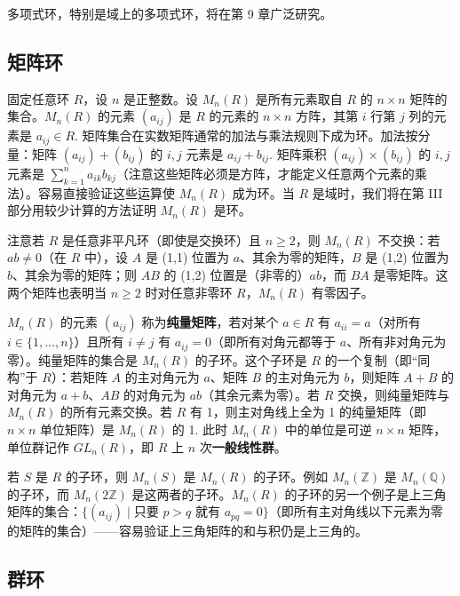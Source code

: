 多项式环，特别是域上的多项式环，将在第 9 章广泛研究。

\subsection*{矩阵环}

固定任意环 \(R\)，设 \(n\) 是正整数。设 \(M_n(R)\) 是所有元素取自 \(R\) 的 \(n \times n\) 矩阵的集合。\(M_n(R)\) 的元素 \((a_{ij})\) 是 \(R\) 的元素的 \(n \times n\) 方阵，其第 \(i\) 行第 \(j\) 列的元素是 \(a_{ij} \in R\). 矩阵集合在实数矩阵通常的加法与乘法规则下成为环。加法按分量：矩阵 \((a_{ij}) + (b_{ij})\) 的 \(i, j\) 元素是 \(a_{ij} + b_{ij}\). 矩阵乘积 \((a_{ij}) \times (b_{ij})\) 的 \(i, j\) 元素是 \(\sum_{k=1}^{n} a_{ik}b_{kj}\)（注意这些矩阵必须是方阵，才能定义任意两个元素的乘法）。容易直接验证这些运算使 \(M_n(R)\) 成为环。当 \(R\) 是域时，我们将在第 III 部分用较少计算的方法证明 \(M_n(R)\) 是环。

注意若 \(R\) 是任意非平凡环（即使是交换环）且 \(n \geq 2\)，则 \(M_n(R)\) 不交换：若 \(ab \neq 0\)（在 \(R\) 中），设 \(A\) 是 (1,1) 位置为 \(a\)、其余为零的矩阵，\(B\) 是 (1,2) 位置为 \(b\)、其余为零的矩阵；则 \(AB\) 的 (1,2) 位置是（非零的）\(ab\)，而 \(BA\) 是零矩阵。这两个矩阵也表明当 \(n \geq 2\) 时对任意非零环 \(R\)，\(M_n(R)\) 有零因子。

\(M_n(R)\) 的元素 \((a_{ij})\) 称为\textbf{纯量矩阵}，若对某个 \(a \in R\) 有 \(a_{ii} = a\)（对所有 \(i \in \{1, \ldots, n\}\)）且所有 \(i \neq j\) 有 \(a_{ij} = 0\)（即所有对角元都等于 \(a\)、所有非对角元为零）。纯量矩阵的集合是 \(M_n(R)\) 的子环。这个子环是 \(R\) 的一个复制（即“同构”于 \(R\)）：若矩阵 \(A\) 的主对角元为 \(a\)、矩阵 \(B\) 的主对角元为 \(b\)，则矩阵 \(A+B\) 的对角元为 \(a+b\)、\(AB\) 的对角元为 \(ab\)（其余元素为零）。若 \(R\) 交换，则纯量矩阵与 \(M_n(R)\) 的所有元素交换。若 \(R\) 有 1，则主对角线上全为 1 的纯量矩阵（即 \(n \times n\) 单位矩阵）是 \(M_n(R)\) 的 1. 此时 \(M_n(R)\) 中的单位是可逆 \(n \times n\) 矩阵，单位群记作 \(GL_n(R)\)，即 \(R\) 上 \(n\) 次\textbf{一般线性群}。

若 \(S\) 是 \(R\) 的子环，则 \(M_n(S)\) 是 \(M_n(R)\) 的子环。例如 \(M_n(\mathbb{Z})\) 是 \(M_n(\mathbb{Q})\) 的子环，而 \(M_n(2\mathbb{Z})\) 是这两者的子环。\(M_n(R)\) 的子环的另一个例子是上三角矩阵的集合：\(\{(a_{ij}) \mid \text{只要 } p > q \text{ 就有 } a_{pq} = 0\}\)（即所有主对角线以下元素为零的矩阵的集合）——容易验证上三角矩阵的和与积仍是上三角的。

\subsection*{群环}

